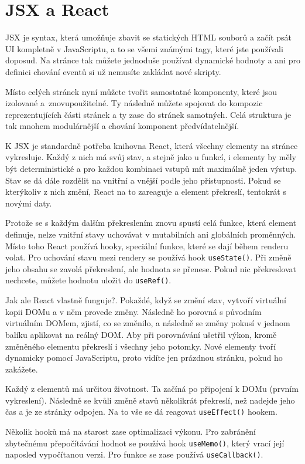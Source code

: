 \section{JSX a React}

JSX je syntax, která umožňuje zbavit se statických HTML souborů a začít psát UI kompletně v JavaScriptu, a to se všemi známými tagy, které jste používali doposud.\cite{JSX} Na stránce tak můžete jednoduše používat dynamické hodnoty a ani pro definici chování eventů si už nemusíte zakládat nové skripty.

Místo celých stránek nyní můžete tvořit samostatné komponenty, které jsou izolované a~znovupoužitelné. Ty následně můžete spojovat do kompozic reprezentujících části stránek a ty zase do stránek samotných. Celá struktura je tak mnohem modulárnější a chování komponent předvídatelnější.

K JSX je standardně potřeba knihovna React, která všechny elementy na stránce vykresluje. Každý z nich má svůj stav, a stejně jako u funkcí, i elementy by měly být deterministické a pro každou kombinaci vstupů mít maximálně jeden výstup. Stav se dá dále rozdělit na vnitřní a vnější podle jeho přístupnosti. Pokud se kterýkoliv z nich změní, React na to zareaguje a element překreslí, tentokrát s novými daty.

Protože se s každým dalším překreslením znovu spustí celá funkce, která element definuje, nelze vnitřní stavy uchovávat v mutabilních ani globálních proměnných.\cite{ReactState} Místo toho React používá hooky, speciální funkce, které se dají během renderu volat. Pro uchování stavu mezi rendery se používá hook \texttt{useState()}. Při změně jeho obsahu se zavolá překreslení, ale hodnota se přenese. Pokud nic překreslovat nechcete, můžete hodnotu uložit do \texttt{useRef()}\cite{UseRef}.

Jak ale React vlastně funguje?\cite{ReactDeepDive}. Pokaždé, když se změní stav, vytvoří virtuální kopii DOMu a v něm provede změny.\cite{VirtualDOM} Následně ho porovná s původním virtuálním DOMem, zjistí, co se změnilo, a následně se změny pokusí v jednom balíku aplikovat na reálný DOM. Aby při porovnávání ušetřil výkon, kromě změněného elementu překreslí i všechny jeho potomky. Nové elementy tvoří dynamicky pomocí JavaScriptu, proto vidíte jen prázdnou stránku, pokud ho zakážete. 

Každý z elementů má určitou životnost. Ta začíná po připojení k DOMu (prvním vykreslení). Následně se kvůli změně stavů několikrát překreslí, než nadejde jeho čas a je ze stránky odpojen. Na to vše se dá reagovat \texttt{useEffect()} hookem.

Několik hooků má na starost zase optimalizaci výkonu. Pro zabránění zbytečnému přepočítávání hodnot se používá hook \texttt{useMemo()}, který vrací její naposled vypočítanou verzi. Pro funkce se zase používá \texttt{useCallback()}.